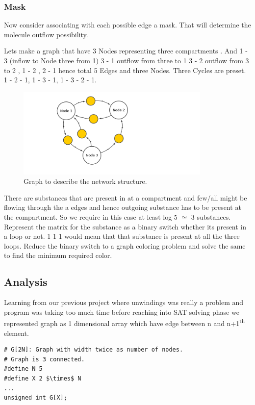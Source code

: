 \documentclass[preprint,12pt]{elsarticle}
\begin{document}
\subsubsection{Mask}
Now consider associating with each possible edge a mask. That will determine the molecule outflow possibility.
 
Lets make a graph that have 3 Nodes representing three compartments . And 1 - 3 (inflow to Node three from 1) 3 - 1 {outflow from three to 1} 3 - 2 { outflow from 3 to 2} , 1 - 2 , 2 - 1 hence total 5 Edges and three Nodes. 
Three Cycles are preset. 1 - 2 - 1, 1 - 3 - 1, 1 - 3 - 2 - 1. 

\begin{figure}[!ht]
  \caption{Graph to describe the network structure.}
  \centering
   \includegraphics[width=0.85\textwidth]{1.png}
\end{figure}

There are substances that are present in at a compartment and few/all might be flowing through the a  edges and hence outgoing substance has to be present at the compartment. So we require in this case at least log 5 $\simeq$ 3 substances. 
Represent the matrix for the substance as a binary switch whether its present in a loop or not. 1 1 1 would mean that that substance is present at all the three loops. Reduce the binary switch to a graph coloring problem and solve the same to find the minimum required color. 

\subsection{Analysis}
Learning from our previous project where unwindings was really a problem and program was taking too much time before reaching into SAT solving phase we represented graph as 1 dimensional array which have edge between n and n+1\textsuperscript{th} element. 

\begin{lstlisting}[mathescape,
  breaklines,
  frame=single,
  caption= \textbf{Graph encoding.}
]
# G[2N]: Graph with width twice as number of nodes.
# Graph is 3 connected.
#define N 5
#define X 2 $\times$ N
...
unsigned int G[X];
\end{lstlisting}
\end{document}
